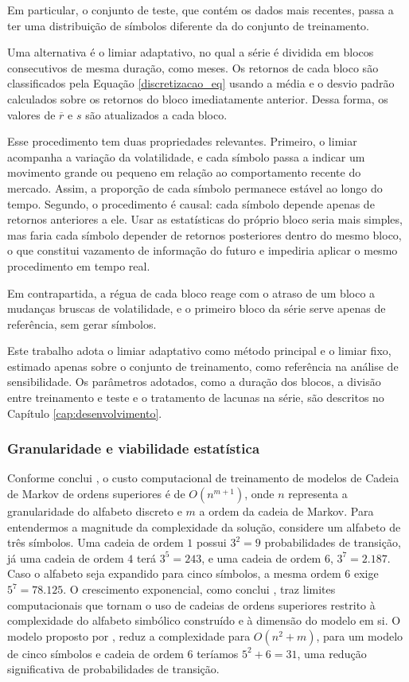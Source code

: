 \documentclass[
    12pt,                %
    openright,           %
    oneside,             %
    a4paper,             %
    english,             %
    brazil               %
]{abntex2}
\begin{document}
Em particular, o conjunto de teste, que contém os dados mais recentes, passa a ter uma distribuição de símbolos diferente da 
do conjunto de treinamento.

Uma alternativa é o limiar adaptativo, no qual a série é dividida em blocos consecutivos de mesma duração, como meses. 
Os retornos de cada bloco são classificados pela Equação \ref{discretizacao_eq} usando a média e o desvio padrão calculados 
sobre os retornos do bloco imediatamente anterior. Dessa forma, os valores de $\overline{r}$ e $s$ são atualizados a cada bloco.

Esse procedimento tem duas propriedades relevantes. Primeiro, o limiar acompanha a variação da volatilidade, 
e cada símbolo passa a indicar um movimento grande ou pequeno em relação ao comportamento recente do mercado. 
Assim, a proporção de cada símbolo permanece estável ao longo do tempo. Segundo, o procedimento é causal: cada símbolo 
depende apenas de retornos anteriores a ele. Usar as estatísticas do próprio bloco seria mais simples, mas faria cada 
símbolo depender de retornos posteriores dentro do mesmo bloco, o que constitui vazamento de informação do futuro e 
impediria aplicar o mesmo procedimento em tempo real. 

Em contrapartida, a régua de cada bloco reage com o atraso de um bloco a mudanças bruscas de volatilidade, e o primeiro 
bloco da série serve apenas de referência, sem gerar símbolos.

Este trabalho adota o limiar adaptativo como método principal e o limiar fixo, estimado apenas sobre o conjunto de treinamento, 
como referência na análise de sensibilidade. Os parâmetros adotados, como a duração dos blocos, a divisão entre 
treinamento e teste e o tratamento de lacunas na série, são descritos no Capítulo \ref{cap:desenvolvimento}.


\subsubsection{Granularidade e viabilidade estatística}

Conforme conclui , o custo computacional de treinamento de modelos de Cadeia de Markov de ordens superiores é de $O(n^{m+1})$, onde $n$ representa 
a granularidade do alfabeto discreto e $m$ a ordem da cadeia de Markov. Para entendermos a magnitude da complexidade da solução, considere um alfabeto de 
três símbolos. Uma cadeia de ordem $1$ possui $3^2=9$ probabilidades de transição, já uma cadeia de ordem $4$ terá $3^5=243$, e uma cadeia de ordem 6, $3^7=2.187$. 
Caso o alfabeto seja expandido para cinco símbolos, a mesma ordem 6 exige $5^7=78.125$. O crescimento exponencial, como conclui , traz limites computacionais 
que tornam o uso de cadeias de ordens superiores restrito à complexidade do alfabeto simbólico construído e à dimensão do modelo em si. 
O modelo proposto por , reduz a complexidade para $O(n^2+m)$, para um modelo de cinco símbolos e 
cadeia de ordem $6$ teríamos $5^2+6=31$, uma redução significativa de probabilidades de transição.
\end{document}
